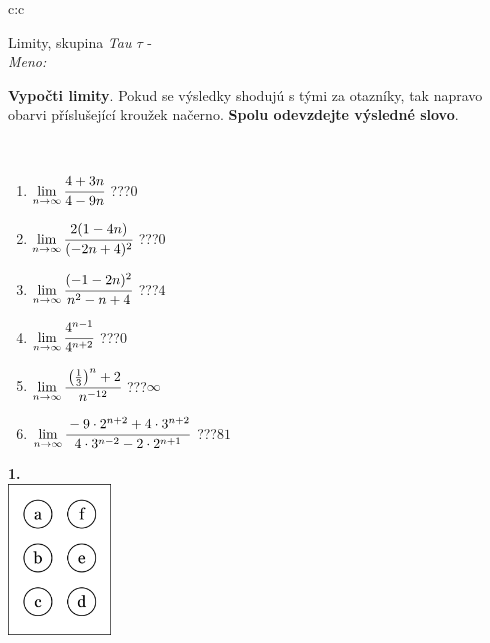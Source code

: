 \documentclass[10pt]{report}
\begin{document}
\begin{tabular}{c:c}
\begin{minipage}[c][104.5mm][t]{0.5\linewidth}
\begin{center}
\vspace{7mm}
{\huge Limity, skupina \textit{Tau $\tau$} -}\\[5mm]
\textit{Meno:}\phantom{xxxxxxxxxxxxxxxxxxxxxxxxxxxxxxxxxxxxxxxxxxxxxxxxxxxxxxxxxxxxxxxxx}\\[5mm]
\begin{minipage}{0.95\linewidth}
\begin{center}
\textbf{Vypočti limity}. Pokud se výsledky shodujú s tými za otazníky, tak napravo\\obarvi příslušející kroužek načerno. \textbf{Spolu odevzdejte výsledné slovo}.
\end{center}
\end{minipage}
\\[1mm]
\begin{minipage}{0.79\linewidth}
\begin{center}
\begin{varwidth}{\linewidth}
\begin{enumerate}
\normalsize
\item $\lim\limits_{n\to\infty}\cfrac{4+3n}{4-9n}$\quad \dotfill\; ???\;\dotfill \quad $0$
\item $\lim\limits_{n\to\infty}\cfrac{2(1-4n)}{(-2n+4)^2}$\quad \dotfill\; ???\;\dotfill \quad $0$
\item $\lim\limits_{n\to\infty}\cfrac{(-1-2n)^2}{n^2-n+4}$\quad \dotfill\; ???\;\dotfill \quad $4$
\item $\lim\limits_{n\to\infty}\cfrac{4^{n-1}}{4^{n+2}}$\quad \dotfill\; ???\;\dotfill \quad $0$
\item $\lim\limits_{n\to\infty}\cfrac{\left(\frac{1}{3}\right)^n +2}{n^{-12}}$\quad \dotfill\; ???\;\dotfill \quad $\infty$
\item $\lim\limits_{n\to\infty}\cfrac{-9\cdot 2^{n+2}+4\cdot 3^{n+2}}{4\cdot 3^{n-2}-2\cdot 2^{n+1}}$\quad \dotfill\; ???\;\dotfill \quad $81$
\end{enumerate}
\end{varwidth}
\end{center}
\end{minipage}
\begin{minipage}{0.20\linewidth}
\begin{center}
{\Huge\bfseries 1.} \\[2mm]
\includegraphics[height=40mm]{../images/braille.png}

\end{center}
\end{minipage}
\end{center}
\end{minipage}
\end{tabular}
\end{document}
